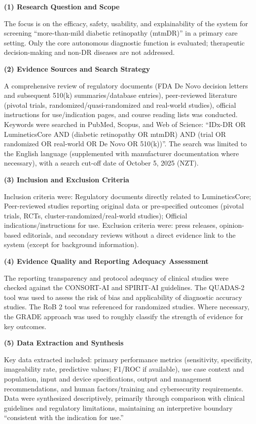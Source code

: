 \documentclass[sigplan,screen]{acmart}
\begin{document}
\textbf{(1) Research Question and Scope}

The focus is on the efficacy, safety, usability, and explainability of the system for screening ``more-than-mild diabetic retinopathy (mtmDR)'' in a primary care setting. Only the core autonomous diagnostic function is evaluated; therapeutic decision-making and non-DR diseases are not addressed.

\textbf{(2) Evidence Sources and Search Strategy}

A comprehensive review of regulatory documents (FDA De Novo decision letters and subsequent 510(k) summaries/database entries), peer-reviewed literature (pivotal trials, randomized/quasi-randomized and real-world studies), official instructions for use/indication pages, and course reading lists was conducted. Keywords were searched in PubMed, Scopus, and Web of Science: ``IDx-DR OR LumineticsCore AND (diabetic retinopathy OR mtmDR) AND (trial OR randomized OR real-world OR De Novo OR 510(k))''. The search was limited to the English language (supplemented with manufacturer documentation where necessary), with a search cut-off date of October 5, 2025 (NZT).

\textbf{(3) Inclusion and Exclusion Criteria}

Inclusion criteria were:  Regulatory documents directly related to LumineticsCore;  Peer-reviewed studies reporting original data or pre-specified outcomes (pivotal trials, RCTs, cluster-randomized/real-world studies);  Official indications/instructions for use. Exclusion criteria were: press releases, opinion-based editorials, and secondary reviews without a direct evidence link to the system (except for background information).

\textbf{(4) Evidence Quality and Reporting Adequacy Assessment}

The reporting transparency and protocol adequacy of clinical studies were checked against the CONSORT-AI and SPIRIT-AI guidelines. The QUADAS-2 tool was used to assess the risk of bias and applicability of diagnostic accuracy studies. The RoB 2 tool was referenced for randomized studies. Where necessary, the GRADE approach was used to roughly classify the strength of evidence for key outcomes.

\textbf{(5) Data Extraction and Synthesis}

Key data extracted included: primary performance metrics (sensitivity, specificity, imageability rate, predictive values; F1/ROC if available), use case context and population, input and device specifications, output and management recommendations, and human factors/training and cybersecurity requirements. Data were synthesized descriptively, primarily through comparison with clinical guidelines and regulatory limitations, maintaining an interpretive boundary ``consistent with the indication for use.''
\end{document}
